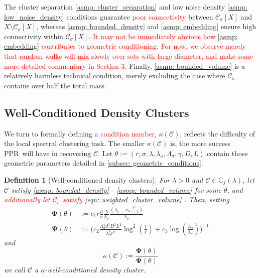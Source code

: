 \documentclass{article}
\newcommand{\1}{\mathbf{1}}
\newcommand{\Phibf}{\mathbf{\Phi}}
\newcommand{\Psibf}{\mathbf{\Psi}}
\newcommand{\Xbf}{X}             %
\newcommand{\Cbb}{\mathbb{C}}
\newcommand{\Cset}{\mathcal{C}}
\newcommand{\Csig}{\Cset_{\sigma}}
\newcommand{\pprspace}{{\sc PPR~}}
\theoremstyle{aldenthm}
\newtheorem{definition}{Definition}
\theoremstyle{aldenrmrk}
\begin{document}
The cluster separation \ref{asmp: cluster_separation} and low noise density \ref{asmp: low_noise_density} conditions guarantee \textcolor{red}{poor connectivity} between $\Csig[\Xbf]$ and $\Xbf \setminus \Csig[\Xbf]$, whereas \ref{asmp: bounded_density} and \ref{asmp: embedding} ensure high connectivity within $\Csig[\Xbf]$. \textcolor{red}{It may not be immediately obvious how \ref{asmp: embedding} contributes to geometric conditioning. For now, we observe merely that random walks will mix slowly over sets with large diameter, and make some more detailed commentary in Section 3.} Finally, \ref{asmp: bounded_volume} is a relatively harmless technical condition, merely excluding the case where $\Csig$ contains over half the total mass.

\subsection{Well-Conditioned Density Clusters}

We turn to formally defining a \textcolor{red}{condition number}, $\kappa(\Cset)$, reflects the difficulty of the local spectral clustering task. The smaller $\kappa(\Cset)$ is, the more success \pprspace will have in recovering $\Cset$. Let $\theta := (r, \sigma, \lambda, \lambda_{\sigma}, \Lambda_{\sigma}, \gamma, D, L)$ contain those geometric parameters detailed in \ref{subsec: geometric_conditions}.

\begin{definition}[Well-conditioned density clusters]
	For $\lambda > 0$ and $\Cset \in \Cbb_f(\lambda)$, let $\Cset$ satisfy \ref{asmp: bounded_density} - \ref{asmp: bounded_volume} for some $\theta$, and \textcolor{red}{ additionally let $\Csig$ satisfy \eqref{eqn: weighted_cluster_volume} }. Then, setting
	\begin{align}
	\label{eqn: condition_number_1}
	\mathbf{\Phi}(\theta) 
	& := c_1 r \frac{d}{\sigma} \frac{\lambda}{\lambda_{\sigma}} \frac{(\lambda_{\sigma} - c_0 \frac{r^{\gamma}}{\gamma + 1})}{\lambda_{\sigma}} \nonumber \\
	\mathbf{\Psi}(\theta) & := \Biggl(c_2 \frac{\Lambda_{\sigma}^4 d^3 D^2 L^2}{\lambda_{\sigma}^4 r^2} \log^2\left(\frac{1}{r}\right) + c_3 \log\left(\frac{\Lambda_{\sigma}}{\lambda_{\sigma}}\right) \Biggr)^{-1}
	\end{align}
	and
	\begin{equation}
	\label{eqn: condition_number}
	\kappa(\Cset) := \frac{\Phibf(\theta)}{\Psibf(\theta)}
	\end{equation}
	we call $\Cset$ a \textrm{$\kappa$-well-conditioned density cluster}.
\end{definition}
\end{document}
